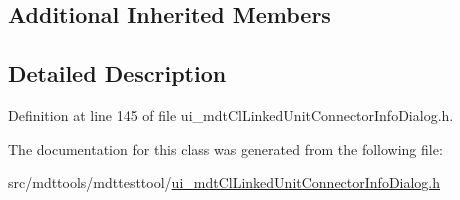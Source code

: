 \subsection*{Additional Inherited Members}


\subsection{Detailed Description}


Definition at line 145 of file ui\-\_\-mdt\-Cl\-Linked\-Unit\-Connector\-Info\-Dialog.\-h.



The documentation for this class was generated from the following file\-:\begin{DoxyCompactItemize}
\item 
src/mdttools/mdttesttool/\hyperlink{ui__mdt_cl_linked_unit_connector_info_dialog_8h}{ui\-\_\-mdt\-Cl\-Linked\-Unit\-Connector\-Info\-Dialog.\-h}\end{DoxyCompactItemize}
